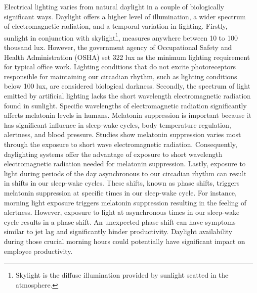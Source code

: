     Electrical lighting varies from natural daylight in a couple of biologically significant ways\cite{Rea}. Daylight offers a higher level of illumination, a wider spectrum of electromagnetic radiation, and a temporal variation in lighting. Firstly, sunlight in conjunction with skylight\footnote{Skylight is the diffuse illumination provided by sunlight scatted in the atmosphere.}, measures anywhere between 10 to 100 thousand lux\cite{Robbins}.
    However, the government agency of Occupational Safety and Health Administration (OSHA) set 322 lux as the minimum lighting requirement for typical office work\cite{OSHA}. Lighting conditions that do not excite photoreceptors responsible for maintaining our circadian rhythm, such as lighting conditions below 100 lux, are considered biological darkness\cite{Leslie,Rea}.
    Secondly, the spectrum of light emitted by artificial lighting lacks the short wavelength electromagnetic radiation found in sunlight. Specific wavelengths of electromagnetic radiation significantly affects melatonin levels in humans. Melatonin suppression is important because it has significant influence in sleep-wake cycles, body temperature regulation, alertness, and blood pressure\cite{Gooley}. Studies show melatonin suppression varies most through the exposure to short wave electromagnetic radiation\cite{Brainard}. Consequently, daylighting systems offer the advantage of exposure to short wavelength electromagnetic radiation needed for melatonin suppression. Lastly, exposure to light during periods of the day asynchronous to our circadian rhythm can result in shifts in our sleep-wake cycles. These shifts, known as phase shifts, triggers melatonin suppression at specific times in our sleep-wake cycle. For instance,  morning light exposure triggers melatonin suppression resulting in the feeling of alertness\cite{Rea}. However, exposure to light at asynchronous times in our sleep-wake cycle results in a phase shift. An unexpected phase shift can have symptoms similar to jet lag and significantly hinder productivity\cite{Rea}. Daylight availability during those crucial morning hours could potentially have significant impact on employee productivity. \\

